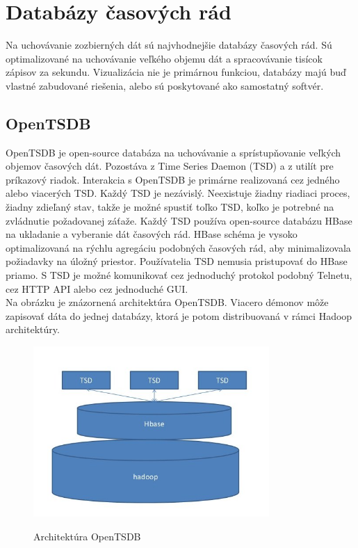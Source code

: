 \documentclass[printed,11pt,twoside,color,cover,table]{fithesis3}
\begin{document}
\section{Databázy časových rád}
Na uchovávanie zozbierných dát sú najvhodnejšie databázy časových rád. Sú optimalizované na uchovávanie veľkého objemu dát a spracovávanie tisícok zápisov za sekundu. Vizualizácia nie je primárnou funkciou,
databázy majú buď vlastné zabudované riešenia, alebo sú poskytované ako samostatný softvér.

\subsection{OpenTSDB}
OpenTSDB je open-source databáza na uchovávanie a sprístupňovanie veľkých objemov časových dát. Pozostáva z Time Series Daemon (TSD) a z utilít pre príkazový riadok. Interakcia s OpenTSDB je primárne realizovaná cez jedného alebo viacerých TSD. Každý TSD je nezávislý.
Neexistuje žiadny riadiaci proces, žiadny zdieľaný stav, takže je možné spustiť toľko TSD, koľko je potrebné na zvládnutie požadovanej záťaže. Každý TSD používa open-source databázu HBase
na ukladanie a vyberanie dát časových rád. HBase schéma je vysoko optimalizovaná na rýchlu agregáciu podobných časových rád, aby minimalizovala požiadavky na úložný priestor. 
Používatelia TSD nemusia pristupovať do HBase priamo. S TSD je možné komunikovať cez jednoduchý protokol podobný Telnetu, cez HTTP API alebo cez jednoduché GUI.\cite{openTSDB}
\\Na obrázku je znázornená architektúra OpenTSDB. Viacero démonov môže zapisovať dáta do jednej databázy, ktorá je potom distribuovaná v rámci Hadoop architektúry.
\begin{figure}[h]
\begin{center}
       \includegraphics[width=0.8\textwidth]{images/opentsdb-arch.jpg}
       \caption{Architektúra OpenTSDB}\cite{opentsdb-arch}
\end{center}
\end{figure}
\end{document}
